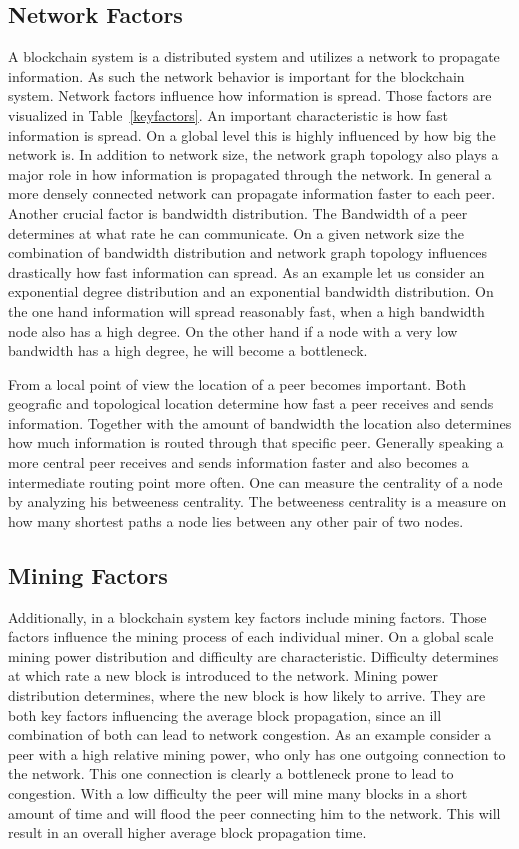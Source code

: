 \subsection{Network Factors}
A blockchain system is a distributed system and utilizes a network to propagate information. As such the network behavior is important for the blockchain system. Network factors influence how information is spread. Those factors are visualized in Table~\ref{keyfactors}. An important characteristic is how fast information is spread. On a global level this is highly influenced by how big the network is. In addition to network size, the network graph topology also plays a major role in how information is propagated through the network. In general a more densely connected network can propagate information faster to each peer. Another crucial factor is bandwidth distribution. The Bandwidth of a peer determines at what rate he can communicate. On a given network size the combination of bandwidth distribution and network graph topology influences drastically how fast information can spread. As an example let us consider an exponential degree distribution and an exponential bandwidth distribution. On the one hand information will spread reasonably fast, when a high bandwidth node also has a high degree. On the other hand if a node with a very low bandwidth has a high degree, he will become a bottleneck.

From a local point of view the location of a peer becomes important. Both geografic and topological location determine how fast a peer receives and sends information. Together with the amount of bandwidth the location also determines how much information is routed through that specific peer. Generally speaking a more central peer receives and sends information faster and also becomes a intermediate routing point more often. One can measure the centrality of a node by analyzing his betweeness centrality. The betweeness centrality is a measure on how many shortest paths a node lies between any other pair of two nodes. 
\subsection{Mining Factors}
Additionally, in a blockchain system key factors include mining factors. Those factors influence the mining process of each individual miner. On a global scale mining power distribution and difficulty are characteristic. Difficulty determines at which rate a new block is introduced to the network. Mining power distribution determines, where the new block is how likely to arrive. They are both key factors influencing the average block propagation, since an ill combination of both can lead to network congestion. As an example consider a peer with a high relative mining power, who only has one outgoing connection to the network. This one connection is clearly a bottleneck prone to lead to congestion. With a low difficulty the peer will mine many blocks in a short amount of time and will flood the peer connecting him to the network. This will result in an overall higher average block propagation time.

